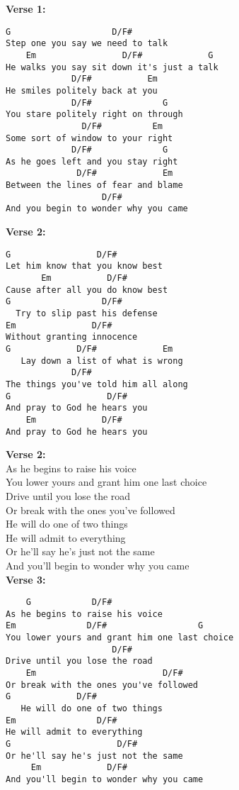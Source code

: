 \begin{minipage}[t]{0.49\textwidth}
\textbf{Verse 1:}
\begin{lstlisting}
G                    D/F#
Step one you say we need to talk
    Em                 D/F#             G
He walks you say sit down it's just a talk
             D/F#           Em
He smiles politely back at you
             D/F#              G
You stare politely right on through
               D/F#          Em
Some sort of window to your right
             D/F#              G
As he goes left and you stay right
              D/F#             Em
Between the lines of fear and blame
                   D/F#
And you begin to wonder why you came
\end{lstlisting}
\bigskip
\textbf{Verse 2:}
\begin{lstlisting}
G                 D/F#
Let him know that you know best
       Em           D/F#
Cause after all you do know best
G                  D/F#
  Try to slip past his defense
Em               D/F#
Without granting innocence
G             D/F#             Em
   Lay down a list of what is wrong
             D/F#
The things you've told him all along
G                   D/F#
And pray to God he hears you
    Em             D/F#
And pray to God he hears you
\end{lstlisting}
\bigskip
\textbf{Verse 2:}\\
As he begins to raise his voice\\
You lower yours and grant him one last choice\\
Drive until you lose the road\\
Or break with the ones you've followed\\
He will do one of two things\\
He will admit to everything\\
Or he'll say he's just not the same\\
And you'll begin to wonder why you came\\
\bigskip
\textbf{Verse 3:}
\begin{lstlisting}
    G            D/F#
As he begins to raise his voice
Em              D/F#                  G
You lower yours and grant him one last choice
					 D/F#
Drive until you lose the road
    Em                         D/F#
Or break with the ones you've followed
G             D/F#
   He will do one of two things
Em                D/F#
He will admit to everything
G                     D/F#
Or he'll say he's just not the same
     Em             D/F#
And you'll begin to wonder why you came
\end{lstlisting}
\end{minipage}%
